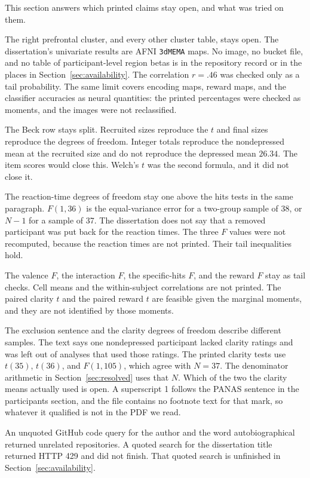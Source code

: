 \documentclass[11pt]{article}
\begin{document}
This section answers which printed claims stay open, and what was tried on
them.

The right prefrontal cluster, and every other cluster table, stays open.
The dissertation's univariate results are AFNI \texttt{3dMEMA} maps.
No image, no bucket file, and no table of participant-level region betas is
in the repository record or in the places in Section~\ref{sec:availability}.
The correlation \(r = .46\) was checked only as a tail probability.
The same limit covers encoding maps, reward maps, and the classifier
accuracies as neural quantities: the printed percentages were checked as
moments, and the images were not reclassified.

The Beck row stays split.
Recruited sizes reproduce the \(t\) and final sizes reproduce the degrees of
freedom.
Integer totals reproduce the nondepressed mean at the recruited size and do
not reproduce the depressed mean \(26.34\).
The item scores would close this.
Welch's \(t\) was the second formula, and it did not close it.

The reaction-time degrees of freedom stay one above the hits tests in the
same paragraph.
\(F(1,36)\) is the equal-variance error for a two-group sample of 38, or
\(N-1\) for a sample of 37.
The dissertation does not say that a removed participant was put back for
the reaction times.
The three \(F\) values were not recomputed, because the reaction times are
not printed.
Their tail inequalities hold.

The valence \(F\), the interaction \(F\), the specific-hits \(F\), and the
reward \(F\) stay as tail checks.
Cell means and the within-subject correlations are not printed.
The paired clarity \(t\) and the paired reward \(t\) are feasible given the
marginal moments, and they are not identified by those moments.

The exclusion sentence and the clarity degrees of freedom describe different
samples.
The text says one nondepressed participant lacked clarity ratings and was
left out of analyses that used those ratings.
The printed clarity tests use \(t(35)\), \(t(36)\), and \(F(1,105)\), which
agree with \(N = 37\).
The denominator arithmetic in Section~\ref{sec:resolved} uses that \(N\).
Which of the two the clarity means actually used is open.
A superscript 1 follows the PANAS sentence in the participants section, and
the file contains no footnote text for that mark, so whatever it qualified
is not in the PDF we read.

An unquoted GitHub code query for the author and the word autobiographical
returned unrelated repositories.
A quoted search for the dissertation title returned HTTP 429 and did not
finish.
That quoted search is unfinished in Section~\ref{sec:availability}.
\end{document}
